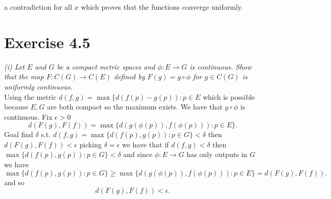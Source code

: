 \documentclass{amsart}
\begin{document}
    a contradiction for all $x$ which proves that the functions converge uniformly.
    \section{Exercise 4.5}
    \emph{(i) Let $E$ and $G$ be a compact metric spaces and $\phi : E \rightarrow G$ is continuous. Show that
        the map $F: C(G) \rightarrow C(E)$ defined by $F(g) = g \circ \phi$ for $g \in C(G)$ is 
    uniformly continuous.}\\
    Using the metric $d(f,g) = \max\{d(f(p)-g(p)):p \in  E$ which is possible because $E,G$ are both compact so the maximum exists. We have that $g \circ \phi $ is continuous.
    Fix $\epsilon > 0$ 
        \[
            d(F(g), F(f)) = \max\{d(g(\phi(p)),f(\phi(p))): p \in E\}
        .\] 
        Goal find $\delta$ s.t. $d(f,g) = \max\{d(f(p),g(p)): p \in G\} < \delta$ then $d(F(g),F(f)) < \epsilon$
        picking $\delta = \epsilon$ we have that if $d(f,g) < \delta$ then $\max\{d(f(p),g(p)) : p \in G\} < \delta$ and since
        $\phi : E \rightarrow G$ has only outputs in $G$ we have
        \[
            \max\{d(f(p),g(p)) : p \in G\} \ge \max\{d(g(\phi(p)), f(\phi(p))) : p \in E\} = d(F(g),F(f))
        .\] 
        and so 
        \[
            d(F(g),F(f)) < \epsilon
        .\] 
\end{document}
